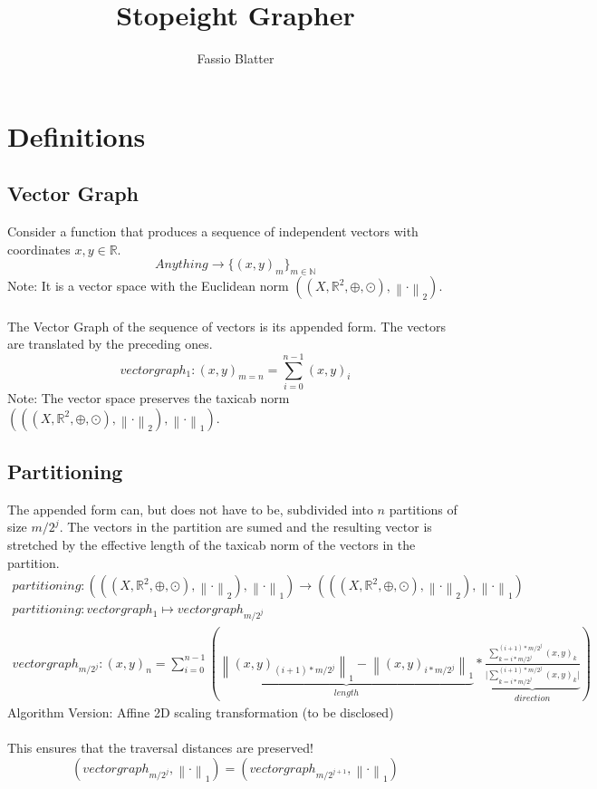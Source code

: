 \documentclass{report}
\newcommand\norm[1]{\left\lVert#1\right\rVert}
\begin{document}
\title{Stopeight Grapher}
\author{Fassio Blatter}
\maketitle

\chapter{Definitions}
\section{Vector Graph}
Consider a function that produces a sequence of independent vectors with coordinates $x,y \in \mathbb{R}$.
\begin{equation}
Anything \rightarrow \{(x,y)_{m}\}_{m \in \mathbb{N}}
\end{equation}
Note: It is a vector space with the Euclidean norm $((X,\mathbb{R}^2,\oplus,\odot),\norm{\cdot}_2)$.\\\\
The Vector Graph of the sequence of vectors is its appended form. The vectors are translated by the preceding ones.\\
\begin{equation}
vectorgraph_{1}: (x,y)_{m=n}=\sum_{i=0}^{n-1} (x,y)_{i}
\end{equation}
Note: The vector space preserves the taxicab norm $(((X,\mathbb{R}^2,\oplus,\odot),\norm{\cdot}_2),\norm{\cdot}_1)$.
\section{Partitioning}
The appended form can, but does not have to be, subdivided into $n$ partitions of size $m/2^j$. The vectors in the partition are sumed and the resulting vector is stretched by the effective length of the taxicab norm of the vectors in the partition.
\begin{align}
partitioning: (((X,\mathbb{R}^2,\oplus,\odot),\norm{\cdot}_2),\norm{\cdot}_1) \rightarrow (((X,\mathbb{R}^2,\oplus,\odot),\norm{\cdot}_2),\norm{\cdot}_1)\\
partitioning: vectorgraph_{1} \mapsto vectorgraph_{m/2^{j}}\\
vectorgraph_{m/2^{j}}:(x,y)_{n}=\sum_{i=0}^{n-1} (\underbrace{\norm{(x,y)_{(i+1)*m/2^j}}_{1} - \norm{(x,y)_{i*m/2^j}}_{1}}_{length} * \underbrace{\frac{\sum_{k=i*m/2^j}^{(i+1)*m/2^j} (x,y)_{k}}{\vert \sum_{k=i*m/2^j}^{(i+1)*m/2^{j}} (x,y)_{k} \vert}}_{direction})
\end{align}
Algorithm Version: Affine 2D scaling transformation (to be disclosed)\\\\
This ensures that the traversal distances are preserved!
\begin{equation}
(vectorgraph_{m/2^j},\norm{\cdot}_{1})=(vectorgraph_{m/2^{j+1}},\norm{\cdot}_{1})
\end{equation}
\end{document}

